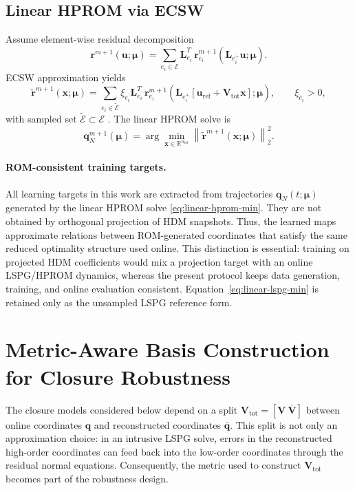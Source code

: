 \documentclass[11pt]{article}
\begin{document}
\subsection{Linear HPROM via ECSW}
Assume element-wise residual decomposition
\begin{equation}
\mathbf r^{m+1}(\mathbf u;\bm\mu)
=
\sum_{e_i\in\mathcal E}
\mathbf L_{e_i}^T\,
\mathbf r_{e_i}^{m+1}(\mathbf L_{e_i^+}\mathbf u;\bm\mu).
\end{equation}
ECSW approximation yields
\begin{equation}
\widetilde{\mathbf r}^{m+1}(\mathbf x;\bm\mu)
=
\sum_{e_i\in\widetilde{\mathcal E}}\xi_{e_i}
\mathbf L_{e_i}^T\,
\mathbf r_{e_i}^{m+1}\!\left(
\mathbf L_{e_i^+}\left[\mathbf u_{\mathrm{ref}}+\mathbf V_{\mathrm{tot}}\mathbf x\right];\bm\mu
\right),
\qquad
\xi_{e_i}>0,
\end{equation}
with sampled set $\widetilde{\mathcal E}\subset\mathcal E$ \cite{farhat2015structure,de2023hyper}. The linear HPROM solve is
\begin{equation}
\mathbf q_N^{m+1}(\bm\mu)
=
\arg\min_{\mathbf x\in\mathbb R^{n_{\mathrm{tot}}}}
\left\|
\widetilde{\mathbf r}^{m+1}(\mathbf x;\bm\mu)
\right\|_2^2.
\label{eq:linear-hprom-min}
\end{equation}

\paragraph{ROM-consistent training targets.}
All learning targets in this work are extracted from trajectories
$\mathbf q_N(t;\bm\mu)$ generated by the linear HPROM solve
\eqref{eq:linear-hprom-min}. They are not obtained by orthogonal projection of
HDM snapshots. Thus, the learned maps approximate relations between
ROM-generated coordinates that satisfy the same reduced optimality structure
used online. This distinction is essential: training on projected HDM
coefficients would mix a projection target with an online LSPG/HPROM dynamics,
whereas the present protocol keeps data generation, training, and online
evaluation consistent. Equation~\eqref{eq:linear-lspg-min} is retained only as
the unsampled LSPG reference form.

\section{Metric-Aware Basis Construction for Closure Robustness}
\label{sec:metric-aware-basis}

The closure models considered below depend on a split
$\mathbf V_{\mathrm{tot}}=[\mathbf V\ \overline{\mathbf V}]$ between online
coordinates $\mathbf q$ and reconstructed coordinates $\bar{\mathbf q}$. This
split is not only an approximation choice: in an intrusive LSPG solve,
errors in the reconstructed high-order coordinates can feed back into the
low-order coordinates through the residual normal equations. Consequently, the
metric used to construct $\mathbf V_{\mathrm{tot}}$ becomes part of the
robustness design.
\end{document}
